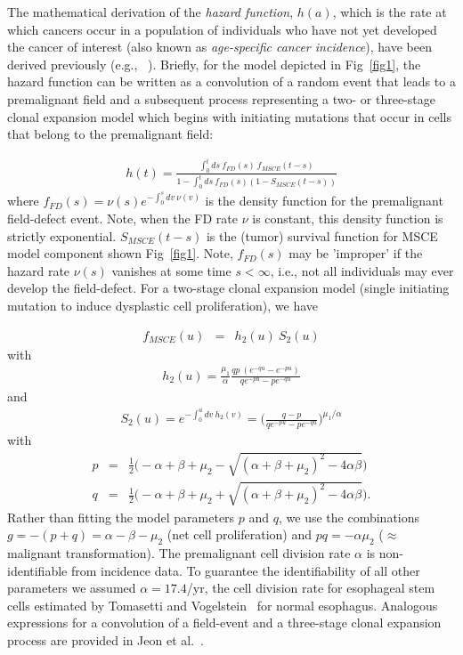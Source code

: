 \documentclass[10pt,letterpaper]{article}
\begin{document}
The mathematical derivation of the {\it hazard function}, $h(a)$, which is the rate at which cancers occur in a population of individuals who have not yet developed the cancer of interest (also known as {\it age-specific cancer incidence}), have been derived previously (e.g., ~\cite{Jeon2006}). Briefly, for the model depicted in Fig~\ref{fig1}, the hazard function can be written as a convolution of a random event that leads to a premalignant field and a subsequent process representing a two- or three-stage clonal expansion model which begins with initiating mutations that occur in cells that belong to the premalignant field:

\begin{eqnarray}
\label{eq:hazard}
    h(t) = \frac{\int_0^t ds \ f_{FD}(s)\ f_{MSCE}(t-s)}{1-\int_0^t ds \ f_{FD}(s)(1-S_{MSCE}(t-s))} 
\end{eqnarray}
where $f_{FD}(s) = \nu(s) e^{-\int_0^s dv \ \nu(v)}$ is the density function for the premalignant field-defect event. Note, when the FD rate $\nu$ is constant, this density function is strictly exponential. $S_{MSCE}(t-s)$ is the (tumor) survival function for MSCE model component shown Fig~\ref{fig1}. Note, $f_{FD}(s)$ may be 'improper' if the hazard rate $\nu(s)$ vanishes at some time $s< \infty$, i.e., not all individuals may ever develop the field-defect. For a two-stage clonal expansion model (single initiating mutation to induce dysplastic cell proliferation), we have

\begin{eqnarray}
\label{eq:MSCE}
    f_{MSCE}(u) &=& h_2(u)\ S_2(u)
\end{eqnarray}
with    
\begin{eqnarray}
\label{eq:h2}
    h_2(u) = \frac{\mu_1}{\alpha} \frac{q p\ (e^{-q u}-e^{-p u})}{q e^{-p u}-p e^{-q u}}
\end{eqnarray}
and
\begin{eqnarray}
\label{eq:S2}
    S_2(u) = e^{-\int_0^u dv \ h_2(v)} = \big( \frac{q-p}{qe^{-pu}-pe^{-qu}} \big) ^{\mu_1/\alpha}
\end{eqnarray}
with
\begin{eqnarray}
\label{eq:pq}
    p &=& \frac{1}{2} \big( -\alpha+\beta+\mu_2 -\sqrt{(\alpha+\beta+\mu_2)^2 -4\alpha\beta} \big) \\ \nonumber
    q &=& \frac{1}{2} \big( -\alpha+\beta+\mu_2 +\sqrt{(\alpha+\beta+\mu_2)^2 -4\alpha\beta} \big) .
\end{eqnarray}
Rather than fitting the model parameters $p$ and $q$, we use the combinations $g=-(p+q)=\alpha-\beta-\mu_2$ (net cell proliferation) and $pq=-\alpha\mu_2$ ($\approx$ malignant transformation). The premalignant cell division rate $\alpha$ is non-identifiable from incidence data. To guarantee the identifiability of all other parameters we assumed $\alpha=17.4$/yr, the cell division rate for esophageal stem cells estimated by Tomasetti and Vogelstein~\cite{Tomasetti2015} for normal esophagus. Analogous expressions for a convolution of a field-event and a three-stage clonal expansion process are provided in Jeon et al.~\cite{Jeon2006}. 
\end{document}
